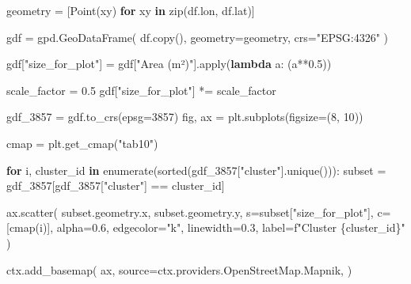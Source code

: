 \documentclass[
  letterpaper,
  DIV=11,
  numbers=noendperiod]{scrreprt}
\newenvironment{Shaded}{\begin{snugshade}}{\end{snugshade}}
\newcommand{\BuiltInTok}[1]{\textcolor[rgb]{0.00,0.23,0.31}{#1}}
\newcommand{\ControlFlowTok}[1]{\textcolor[rgb]{0.00,0.23,0.31}{\textbf{#1}}}
\newcommand{\DecValTok}[1]{\textcolor[rgb]{0.68,0.00,0.00}{#1}}
\newcommand{\FloatTok}[1]{\textcolor[rgb]{0.68,0.00,0.00}{#1}}
\newcommand{\KeywordTok}[1]{\textcolor[rgb]{0.00,0.23,0.31}{\textbf{#1}}}
\newcommand{\NormalTok}[1]{\textcolor[rgb]{0.00,0.23,0.31}{#1}}
\newcommand{\OperatorTok}[1]{\textcolor[rgb]{0.37,0.37,0.37}{#1}}
\newcommand{\SpecialCharTok}[1]{\textcolor[rgb]{0.37,0.37,0.37}{#1}}
\newcommand{\SpecialStringTok}[1]{\textcolor[rgb]{0.13,0.47,0.30}{#1}}
\newcommand{\StringTok}[1]{\textcolor[rgb]{0.13,0.47,0.30}{#1}}
\begin{document}
\begin{Shaded}
\begin{Highlighting}[]
\NormalTok{geometry }\OperatorTok{=}\NormalTok{ [Point(xy) }\ControlFlowTok{for}\NormalTok{ xy }\KeywordTok{in} \BuiltInTok{zip}\NormalTok{(df.lon, df.lat)]}

\NormalTok{gdf }\OperatorTok{=}\NormalTok{ gpd.GeoDataFrame(}
\NormalTok{    df.copy(), }
\NormalTok{    geometry}\OperatorTok{=}\NormalTok{geometry,}
\NormalTok{    crs}\OperatorTok{=}\StringTok{"EPSG:4326"}
\NormalTok{)}

\NormalTok{gdf[}\StringTok{"size\_for\_plot"}\NormalTok{] }\OperatorTok{=}\NormalTok{ gdf[}\StringTok{"Area (m²)"}\NormalTok{].}\BuiltInTok{apply}\NormalTok{(}\KeywordTok{lambda}\NormalTok{ a: (a}\OperatorTok{**}\FloatTok{0.5}\NormalTok{))}

\NormalTok{scale\_factor }\OperatorTok{=} \FloatTok{0.5}
\NormalTok{gdf[}\StringTok{"size\_for\_plot"}\NormalTok{] }\OperatorTok{*=}\NormalTok{ scale\_factor}

\NormalTok{gdf\_3857 }\OperatorTok{=}\NormalTok{ gdf.to\_crs(epsg}\OperatorTok{=}\DecValTok{3857}\NormalTok{)}
\NormalTok{fig, ax }\OperatorTok{=}\NormalTok{ plt.subplots(figsize}\OperatorTok{=}\NormalTok{(}\DecValTok{8}\NormalTok{, }\DecValTok{10}\NormalTok{))}

\NormalTok{cmap }\OperatorTok{=}\NormalTok{ plt.get\_cmap(}\StringTok{"tab10"}\NormalTok{)}

\ControlFlowTok{for}\NormalTok{ i, cluster\_id }\KeywordTok{in} \BuiltInTok{enumerate}\NormalTok{(}\BuiltInTok{sorted}\NormalTok{(gdf\_3857[}\StringTok{"cluster"}\NormalTok{].unique())):}
\NormalTok{    subset }\OperatorTok{=}\NormalTok{ gdf\_3857[gdf\_3857[}\StringTok{"cluster"}\NormalTok{] }\OperatorTok{==}\NormalTok{ cluster\_id]}
    
\NormalTok{    ax.scatter(}
\NormalTok{        subset.geometry.x,}
\NormalTok{        subset.geometry.y,}
\NormalTok{        s}\OperatorTok{=}\NormalTok{subset[}\StringTok{"size\_for\_plot"}\NormalTok{],}
\NormalTok{        c}\OperatorTok{=}\NormalTok{[cmap(i)],}
\NormalTok{        alpha}\OperatorTok{=}\FloatTok{0.6}\NormalTok{,}
\NormalTok{        edgecolor}\OperatorTok{=}\StringTok{"k"}\NormalTok{,}
\NormalTok{        linewidth}\OperatorTok{=}\FloatTok{0.3}\NormalTok{,}
\NormalTok{        label}\OperatorTok{=}\SpecialStringTok{f"Cluster }\SpecialCharTok{\{}\NormalTok{cluster\_id}\SpecialCharTok{\}}\SpecialStringTok{"}
\NormalTok{    )}

\NormalTok{ctx.add\_basemap(}
\NormalTok{    ax,}
\NormalTok{    source}\OperatorTok{=}\NormalTok{ctx.providers.OpenStreetMap.Mapnik,}
\NormalTok{)}


\end{Highlighting}
\end{Shaded}
\end{document}
